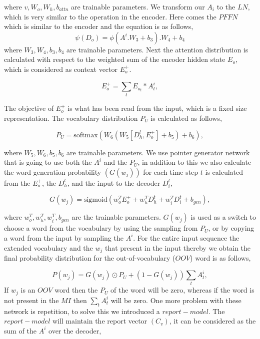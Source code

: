 \documentclass[preprint,review,12pt]{elsarticle}
\begin{document}
where $v, W_o, W_h, b_{attn}$ are trainable parameters. We transform our $A_i$ to the $LN$, which is very similar to the operation in the encoder. Here comes the $PFFN$
which is similar to the encoder and the equation is as follows,
\begin{equation}  \label{eq2}
	\psi(D_o) = \phi(A^i.W_3 + b_3).W_4 + b_4
\end{equation} 
where $W_3, W_4, b_3,b_4$ are trainable parameters. Next the attention distribution is calculated with respect to the weighted sum of the encoder hidden state $E_o$, which is considered as context vector $E_o^+$. %

\begin{equation}
	E_o^+ = \sum_t E_{o_{t}}*A^i_t,
\end{equation}

The objective of $E_o^+$ is what has been read from the input, which is a fixed size representation. The vocabulary distribution $P_{U}$ is calculated as follows,

\begin{equation}
	P_{U} = \text{softmax}\left(W_6 (W_5[D_h^l,E_o^+]+b_5)+b_6\right) ,
\end{equation}

where $W_5,W_6,b_5,b_6$ are trainable parameters. We use pointer generator network that is going to use both the $A^i$ and the $P_{U}$, in addition to this we also calculate the word generation probability $(G(w_j))$ for each time step $t$ is calculated from the  $E_o^+$, the $D_h^t$, and the input to the decoder $D_i^t$,
	

\begin{equation}
	G(w_j) = \text{sigmoid}\left(w_o^T E_o^+ + w_h^T D_h^t + w_i^T D_i^t + b_{gen}\right) ,
\end{equation}

where $w_o^T, w_h^T, w_i^T, b_{gen}$ are the trainable parameters.  $G(w_j)$ is used as a switch to choose a word from the vocabulary by using the sampling from $P_{U}$, or by copying a word from the input by sampling the $A^i$. For the entire input sequence the extended vocabulary and the $w_j$ that present in the input thereby we obtain the final probability distribution for the out-of-vocabulary ($OOV$) word is as follows,

\begin{equation}
	P(w_j) = G(w_j) \odot P_{U} + (1-G(w_j)) \sum_t A^i_t, 
\end{equation}
If $w_j$ is an $OOV$ word then the $P_{U}$ of the word will be zero, whereas if the word is not present in the $MI$ then $\sum_t A^i_t$ will be zero. One more problem with these network is repetition, to solve this we introduced a $report-model$. The $report-model$ will maintain the report vector $(C_v)$, it can be considered as the sum of the $A^i$ over the decoder,
\end{document}
